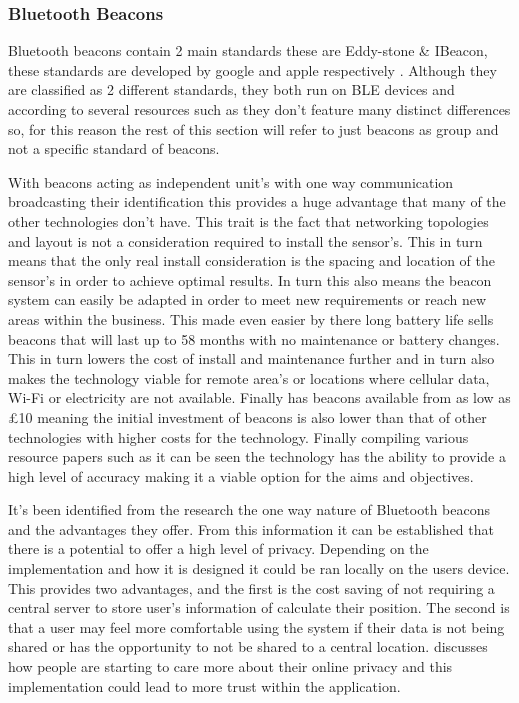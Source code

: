 \subsubsection{Bluetooth Beacons}
Bluetooth beacons contain 2 main standards these are Eddy-stone \& IBeacon, these standards are developed by google and apple respectively \citetemp. Although they are classified as 2 different standards, they both run on BLE devices and according to several resources such as \citetemp they don’t feature many distinct differences so, for this reason the rest of this section will refer to just beacons as group and not a specific standard of beacons.

With beacons acting as independent unit's with one way communication broadcasting their identification \citetemp this provides a huge advantage that many of the other technologies don't have. This trait is the fact that networking topologies and layout is not a consideration required to install the sensor's. This in turn means that the only real install consideration is the spacing and location of the sensor's in order to achieve optimal results. In turn this also means the beacon system can easily be adapted in order to meet new requirements or reach new areas within the business. This made even easier by there long battery life \citetemp sells beacons that will last up to 58 months with no maintenance or battery changes. This in turn lowers the cost of install and maintenance further and in turn also makes the technology viable for remote area's or locations where cellular data, Wi-Fi or electricity are not available. Finally \citetemp has beacons available from as low as £10 meaning the initial investment of beacons is also lower than that of other technologies with higher costs for the technology. Finally compiling various resource papers such as \citetemp it can be seen the technology has the ability to provide a high level of accuracy making it a viable option for the aims and objectives.

It's been identified from the research the one way nature of Bluetooth beacons and the advantages they offer. From this information it can be established that there is a potential to offer a high level of privacy. Depending on the implementation and how it is designed it could be ran locally on the users device. This provides two advantages, and the first is the cost saving of not requiring a central server to store user's information of calculate their position. The second is that a user may feel more comfortable using the system if their data is not being shared or has the opportunity to not be shared to a central location. \citetemp discusses how people are starting to care more about their online privacy and this implementation could lead to more trust within the application.

